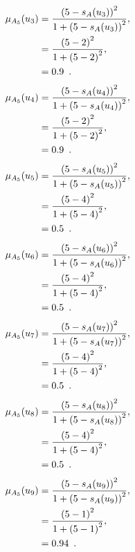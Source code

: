 \documentclass[a4paper,openany]{book}
\begin{document}
				\begin{align}
					\mu_{A_5}(u_3) &= \frac{\left(5-s_A(u_3)\right)^2}{1 + \left(5-s_A(u_3)\right)^2} ,\\
					&= \frac{\left(5-2\right)^2}{1 + \left(5-2\right)^2} \notag ,\\
					&= 0.9 \enspace. \notag
				\end{align}
				\begin{align}
					\mu_{A_5}(u_4) &= \frac{\left(5-s_A(u_4)\right)^2}{1 + \left(5-s_A(u_4)\right)^2} ,\\
					&= \frac{\left(5-2\right)^2}{1 + \left(5-2\right)^2} \notag ,\\
					&= 0.9 \enspace. \notag
				\end{align}
				\begin{align}
					\mu_{A_5}(u_5) &= \frac{\left(5-s_A(u_5)\right)^2}{1 + \left(5-s_A(u_5)\right)^2} ,\\
					&= \frac{\left(5-4\right)^2}{1 + \left(5-4\right)^2} \notag ,\\
					&= 0.5 \enspace. \notag
				\end{align}
				\begin{align}
					\mu_{A_5}(u_6) &= \frac{\left(5-s_A(u_6)\right)^2}{1 + \left(5-s_A(u_6)\right)^2} ,\\
					&= \frac{\left(5-4\right)^2}{1 + \left(5-4\right)^2} \notag ,\\
					&= 0.5 \enspace. \notag
				\end{align}
				\begin{align}
					\mu_{A_5}(u_7) &= \frac{\left(5-s_A(u_7)\right)^2}{1 + \left(5-s_A(u_7)\right)^2} ,\\
					&= \frac{\left(5-4\right)^2}{1 + \left(5-4\right)^2} \notag ,\\
					&= 0.5 \enspace. \notag
				\end{align}
				\begin{align}
					\mu_{A_5}(u_8) &= \frac{\left(5-s_A(u_8)\right)^2}{1 + \left(5-s_A(u_8)\right)^2} ,\\
					&= \frac{\left(5-4\right)^2}{1 + \left(5-4\right)^2} \notag ,\\
					&= 0.5 \enspace. \notag
				\end{align}
				\begin{align}
					\mu_{A_5}(u_9) &= \frac{\left(5-s_A(u_9)\right)^2}{1 + \left(5-s_A(u_9)\right)^2} ,\\
					&= \frac{\left(5-1\right)^2}{1 + \left(5-1\right)^2} \notag ,\\
					&= 0.94 \enspace. \notag
				\end{align}
\end{document}
